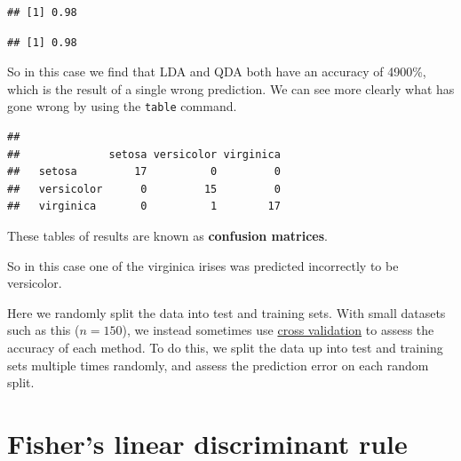 \documentclass[
]{book}
\newenvironment{Shaded}{\begin{snugshade}}{\end{snugshade}}
\newcommand{\DecValTok}[1]{\textcolor[rgb]{0.00,0.00,0.81}{#1}}
\newcommand{\FunctionTok}[1]{\textcolor[rgb]{0.00,0.00,0.00}{#1}}
\newcommand{\NormalTok}[1]{#1}
\newcommand{\OtherTok}[1]{\textcolor[rgb]{0.56,0.35,0.01}{#1}}
\newcommand{\SpecialCharTok}[1]{\textcolor[rgb]{0.00,0.00,0.00}{#1}}
\theoremstyle{definition}
\theoremstyle{definition}
\theoremstyle{definition}
\theoremstyle{definition}
\theoremstyle{remark}
\begin{document}
\begin{verbatim}
## [1] 0.98
\end{verbatim}

\begin{Shaded}
\end{Shaded}

\begin{verbatim}
## [1] 0.98
\end{verbatim}

So in this case we find that LDA and QDA both have an accuracy of 4900\%, which is the result of a single wrong prediction. We can see more clearly what has gone wrong by using the \texttt{table} command.

\begin{Shaded}
\end{Shaded}

\begin{verbatim}
##             
##              setosa versicolor virginica
##   setosa         17          0         0
##   versicolor      0         15         0
##   virginica       0          1        17
\end{verbatim}

These tables of results are known as \textbf{confusion matrices}.

So in this case one of the virginica irises was predicted incorrectly to be versicolor.

Here we randomly split the data into test and training sets. With small datasets such as this (\(n=150\)), we instead sometimes use \href{https://en.wikipedia.org/wiki/Cross-validation_(statistics)}{cross validation} to assess the accuracy of each method. To do this, we split the data up into test and training sets multiple times randomly, and assess the prediction error on each random split.

\hypertarget{FLDA}{%
\section{Fisher's linear discriminant rule}\label{FLDA}}
\end{document}
